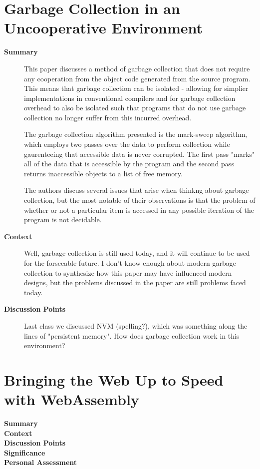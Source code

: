 \section {Garbage Collection in an Uncooperative Environment \cite{boehm1988garbage}}

\begin{description}
    \item[\textbf{Summary}]
        This paper discusses a method of garbage collection that does not require
        any cooperation from the object code generated from the source program.
        This means that garbage collection can be isolated - allowing for simplier
        implementations in conventional compilers and for garbage collection
        overhead to also be isolated such that programs that do not use garbage
        collection no longer suffer from this incurred overhead.
        
        The garbage collection algorithm presented is the mark-sweep algorithm, which employs
        two passes over the data to perform collection while gaurenteeing that
        accessible data is never corrupted. The first pass "marks" all of the data
        that is accessible by the program and the second pass returns inaccessible
        objects to a list of free memory.

        The authors discuss several issues that arise when thinkng about garbage
        collection, but the most notable of their observations is that the
        problem of whether or not a particular item is accessed in any possible
        iteration of the program is not decidable. 
    \item[\textbf{Context}]
        Well, garbage collection is still used today, and it will continue to be used
        for the forseeable future. I don't know enough about modern garbage collection
        to synthesize how this paper may have influenced modern designs, but the
        problems discussed in the paper are still problems faced today.
    \item[\textbf{Discussion Points}]
        Last class we discussed NVM (spelling?), which was something along the lines of "persistent memory". How does garbage collection work in this environment?
\end{description}

\section {Bringing the Web Up to Speed with WebAssembly \cite{haas2017bringing}}

\begin{description}
    \item[\textbf{Summary}]
    \item[\textbf{Context}]
    \item[\textbf{Discussion Points}]
    \item[\textbf{Significance}]
    \item[\textbf{Personal Assessment}]
\end{description}